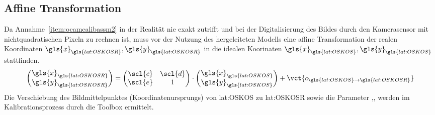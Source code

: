 \subsection{Affine Transformation}
Da Annahme~\ref{item:ocamcalibassm2} in der Realität nie exakt zutrifft und bei der Digitalisierung des Bildes durch den Kamerasensor mit nichtquadratischen Pixeln zu rechnen ist, muss vor der Nutzung des hergeleiteten Modells eine affine Transformation der realen Koordinaten \(\gls{x}_{\gls{lat:OSKOSR}}, \gls{y}_{\gls{lat:OSKOSR}}\) in die idealen Koorinaten \(\gls{x}_{\gls{lat:OSKOS}}, \gls{y}_{\gls{lat:OSKOS}}\) stattfinden.
\begin{equation}
\begin{pmatrix}
\gls{x}_{\gls{lat:OSKOSR}} \\ \gls{y}_{\gls{lat:OSKOSR}}
\end{pmatrix}
=
\begin{pmatrix}
\scl{c} & \scl{d} \\
\scl{e} & 1 
\end{pmatrix}
\cdot
\begin{pmatrix}
\gls{x}_{\gls{lat:OSKOS}} \\ \gls{y}_{\gls{lat:OSKOS}}
\end{pmatrix}
+
\vct{c_{\gls{lat:OSKOS}\rightarrow\gls{lat:OSKOSR}}}
\end{equation}
 Die Verschiebung des Bildmittelpunktes (Koordinatenursprungs) von \gls{lat:OSKOS} zu \gls{lat:OSKOSR}  sowie die Parameter ,, werden im Kalibrationsprozess durch die Toolbox ermittelt.


